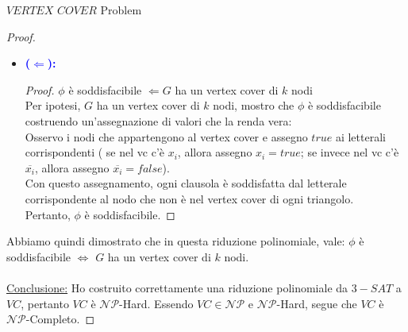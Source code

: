 \documentclass{article}  %
\theoremstyle{definition}
\begin{document}
\begin{theorem}{$VERTEX$ $COVER$ Problem}
\begin{proof}
\begin{itemize}
\begin{proof}
\begin{center}
				      \end{center}
				      Quindi, l'insieme di vertici così definito è un vertex cover.  \\
				      Pertanto, $G$ ha un vertex cover di $k=m+2l$ nodi.
			      \end{proof}
			\item \textcolor{blue}{\textbf{($\Longleftarrow$):}}
			      \begin{proof}
				      $\phi$ è soddisfacibile $\Longleftarrow G$ ha un vertex cover di $k$ nodi \\
				      Per ipotesi, $G$ ha un vertex cover di $k$ nodi, mostro che $\phi$ è soddisfacibile costruendo
				      un'assegnazione di valori che la renda vera: \\
				      Osservo i nodi che appartengono al vertex cover e assegno $true$ ai letterali corrispondenti (
				      se nel vc c'è $x_i$, allora assegno $x_i=true$; se invece nel vc c'è $\overline{x_i}$, allora assegno
				      $\overline{x_i}=false$). \\
				      Con questo assegnamento, ogni clausola è soddisfatta dal letterale corrispondente al nodo che non è nel vertex cover
				      di ogni triangolo. \\
				      Pertanto, $\phi$ è soddisfacibile.
			      \end{proof}
		\end{itemize}
		Abbiamo quindi dimostrato che in questa riduzione polinomiale, vale:
		$\phi$ è soddisfacibile $\iff$ $G$ ha un vertex cover di $k$ nodi. \\ \\

		\underline{Conclusione:} Ho costruito correttamente una riduzione polinomiale da $3-SAT$ a $VC$, pertanto $VC$ è $\mathcal{NP}$-Hard.
		Essendo $VC \in \mathcal{NP}$ e $\mathcal{NP}$-Hard, segue che $VC$ è $\mathcal{NP}$-Completo.
	\end{proof}
\end{theorem}
\end{document}
